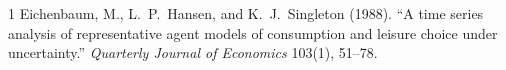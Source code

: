 \documentclass[12pt]{article}
\theoremstyle{definition}
\theoremstyle{plain}
\begin{document}
\vspace{0.8em}

\begin{thebibliography}{1}
Eichenbaum, M., L.\ P.\ Hansen, and K.\ J.\ Singleton (1988).
\newblock ``A time series analysis of representative agent models of consumption and leisure choice under uncertainty.''
\newblock \emph{Quarterly Journal of Economics} 103(1), 51--78.
\end{thebibliography}
\end{document}
